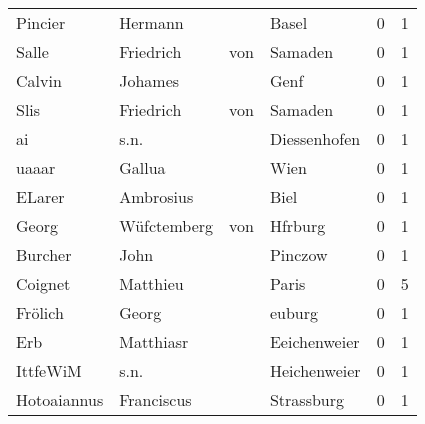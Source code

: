\begin{center}
\begin{tiny}
\begin{longtabu}{llllrr}
                  Pincier &                            Hermann &             &                                       Basel &          0 &         1 \\
                    Salle &                          Friedrich &         von &                                     Samaden &          0 &         1 \\
                   Calvin &                            Johames &             &                                        Genf &          0 &         1 \\
                     Slis &                          Friedrich &         von &                                     Samaden &          0 &         1 \\
                       ai &                               s.n. &             &                                Diessenhofen &          0 &         1 \\
                    uaaar &                             Gallua &             &                                        Wien &          0 &         1 \\
                   ELarer &                          Ambrosius &             &                                        Biel &          0 &         1 \\
                    Georg &                        Wüfctemberg &         von &                                     Hfrburg &          0 &         1 \\
                  Burcher &                               John &             &                                     Pinczow &          0 &         1 \\
                  Coignet &                           Matthieu &             &                                       Paris &          0 &         5 \\
                  Frölich &                              Georg &             &                                      euburg &          0 &         1 \\
                      Erb &                          Matthiasr &             &                                Eeichenweier &          0 &         1 \\
                 IttfeWiM &                               s.n. &             &                                Heichenweier &          0 &         1 \\
              Hotoaiannus &                         Franciscus &             &                                  Strassburg &          0 &         1 \\

\end{longtabu}
\end{tiny}
\end{center}

